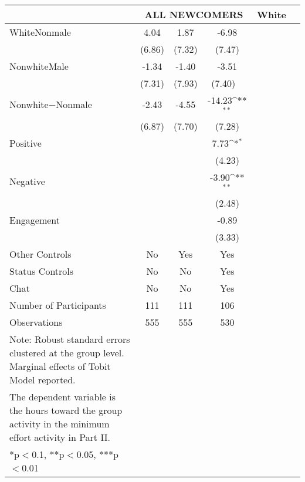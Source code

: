 {\tiny
\def\sym#1{\ifmmode^{#1}\else\(^{#1}\)\fi}
\begin{tabular}{l*{7}{c}}
\toprule
          & \multicolumn{3}{c}{ALL NEWCOMERS}   &\multicolumn{3}{c}{White}     \\
\midrule
WhiteNonmale  &  4.04          &  1.87  &  -6.98     \\
                    &  (6.86)       &  (7.32)  &  (7.47)    \\
\addlinespace
NonwhiteMale  &  -1.34       &   -1.40    &  -3.51   \\
                    &   (7.31)      & (7.93)             &  (7.40)     \ \\
\addlinespace
Nonwhite$-$Nonmale  &  -2.43      &   -4.55   &  -14.23\sym{**}     \\
                        &    (6.87)   & (7.70)      &  (7.28)   \\
                        
\addlinespace
Positive                 &         &         &  7.73\sym{*}     \\
                         &           &      &  (4.23)   \\
\addlinespace
Negative                 &     &        &  -3.90\sym{**}   \\
                          &    &     &  (2.48)    \\
\addlinespace
Engagement                 &     &         & -0.89    \\
                              &     &         &  (3.33)   \\

\midrule
Other Controls   &   No &  Yes &    Yes    \\
Status Controls &   No  &    No    &    Yes    \\
Chat          &    No    &    No   &    Yes          \\
\midrule
Number of Participants & 111   &    111 &    106    \\
\midrule
Observations          &   555   &  555  &  530         \\
\bottomrule
Note: Robust standard errors clustered at the group level. Marginal effects of Tobit Model reported. \\
The dependent variable is the hours toward the group activity in the minimum effort activity in Part II. \\
*p$<$0.1, **p$<$0.05, ***p$<$0.01
\end{tabular}
}
